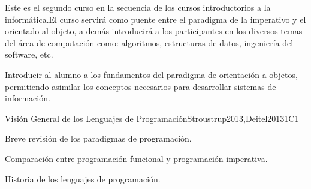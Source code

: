 \begin{syllabus}


\begin{justification}
Este es el segundo curso en la secuencia de los cursos introductorios a la informática.El curso servirá como puente entre el paradigma de la imperativo y el orientado al objeto, a demás introducirá a
los participantes en los diversos temas del área de computación como: algoritmos, estructuras de datos, ingeniería del software, etc.
\end{justification}

\begin{goals}
\item Introducir al alumno a los fundamentos del paradigma de orientación a objetos, permitiendo asimilar los conceptos necesarios para desarrollar sistemas de información.
\end{goals}

\begin{outcomes}
    \item {}
    \item {}
    \item {}
    \item {}
\end{outcomes}

\begin{competences}
    \item {} 
    \item {} 
    \item {} 
    \item {}
    \item {}
    \item {}
    \item {}
\end{competences}

\begin{unit}{Visión General de los Lenguajes de Programación}{}{Stroustrup2013,Deitel2013}{1}{C1}
    \begin{topics}
        \item Breve revisión de los paradigmas de programación.
        \item Comparación entre programación funcional y programación imperativa.
        \item Historia de los lenguajes de programación.
    \end{topics}
    \begin{learningoutcomes}
        \item \SPHistoryLODiscussTheForLanguage [\Familiarity]
    \end{learningoutcomes}
\end{unit}


\end{syllabus}
